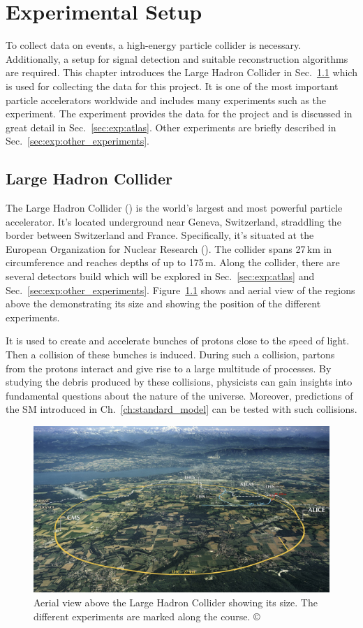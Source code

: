 \documentclass[bachelor,ngerman,english]{GAUBM}
\begin{document}
\chapter{Experimental Setup}
\label{ch:experimental_setup}
To collect data on \ttHWW events, a high-energy particle collider is necessary. Additionally, a setup for signal detection and suitable reconstruction algorithms are required. This chapter introduces the Large Hadron Collider in Sec.~\ref{sec:exp:lhc} which is used for collecting the data for this project. It is one of the most important particle accelerators worldwide and includes many experiments such as the \atlas experiment. The \atlas experiment provides the data for the project and is discussed in great detail in Sec.~\ref{sec:exp:atlas}. Other experiments are briefly described in Sec.~\ref{sec:exp:other_experiments}.

\section{Large Hadron Collider}
\label{sec:exp:lhc}
The Large Hadron Collider (\lhc) \cite{lhc_01,lhc_02} is the world's largest and most powerful particle accelerator. It's located underground near Geneva, Switzerland, straddling the border between Switzerland and France. Specifically, it's situated at the European Organization for Nuclear Research (\cern). The collider spans 27\,km in circumference and reaches depths of up to 175\,m. Along the collider, there are several detectors build which will be explored in Sec.~\ref{sec:exp:atlas} and Sec.~\ref{sec:exp:other_experiments}. Figure~\ref{fig:lhc_aerial_view} shows and aerial view of the regions above the \lhc demonstrating its size and showing the position of the different experiments.

It is used to create and accelerate bunches of protons close to the speed of light. Then a collision of these bunches is induced. During such a collision, partons from the protons interact and give rise to a large multitude of processes. By studying the debris produced by these collisions, physicists can gain insights into fundamental questions about the nature of the universe. Moreover, predictions of the SM introduced in Ch.~\ref{ch:standard_model} can be tested with such collisions. 

\begin{figure}[t]
    \centering
    \includegraphics[width=.80\textwidth]{figures/lhc/lhc_overview.jpg}
    \caption{Aerial view above the Large Hadron Collider showing its size. The different experiments are marked along the \lhc course. \copyright{\cern}}
    \label{fig:lhc_aerial_view}
\end{figure}
\end{document}

